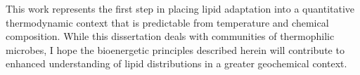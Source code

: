 
This work represents the first step in placing lipid adaptation into a quantitative thermodynamic context that is predictable from temperature and chemical composition. While this dissertation deals with communities of thermophilic microbes, I hope the bioenergetic principles described herein will contribute to enhanced understanding of lipid distributions in a greater geochemical context.